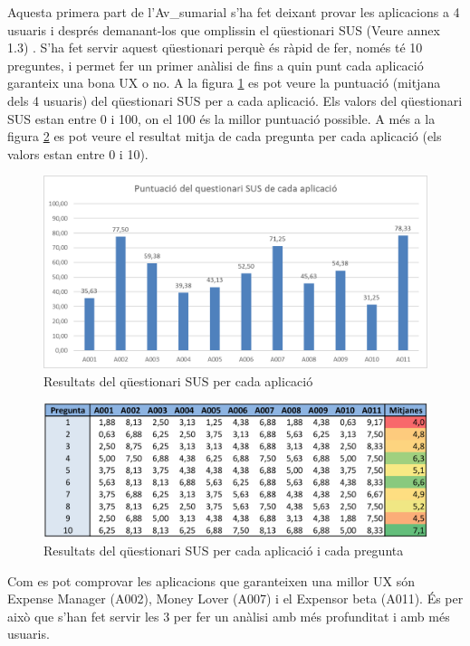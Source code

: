 Aquesta primera part de l'\gls{Av_sumarial} s'ha fet deixant provar les aplicacions a 4 usuaris i després demanant-los que omplissin el qüestionari SUS (Veure annex 1.3) . S'ha fet servir aquest qüestionari perquè és ràpid de fer, només té 10 preguntes, i permet fer un primer anàlisi de fins a quin punt cada aplicació garanteix una bona \ac{UX} o no. A la figura \ref{fig:SUS_analisi} es pot veure la puntuació (mitjana dels 4 usuaris) del qüestionari SUS per a cada aplicació. Els valors del qüestionari SUS estan entre 0 i 100, on el 100 és la millor puntuació possible. A més a la figura \ref{fig:SUS_table} es pot veure el resultat mitja de cada pregunta per cada aplicació (els valors estan entre 0 i 10).

\begin{figure}[htp]
\centering
\includegraphics[scale=0.8]{SUS_analisi_1.png}
\caption{Resultats del qüestionari SUS per cada aplicació}\label{fig:SUS_analisi}
\end{figure}

\begin{figure}[htp]
\centering
\includegraphics[scale=0.9]{SUS_table_2.png}
\caption{Resultats del qüestionari SUS per cada aplicació i cada pregunta}\label{fig:SUS_table}
\end{figure}

Com es pot comprovar les aplicacions que garanteixen una millor \ac{UX} són Expense Manager (A002), Money Lover (A007) i el Expensor beta (A011). És per això que s'han fet servir les 3 per fer un anàlisi amb més profunditat i amb més usuaris.

